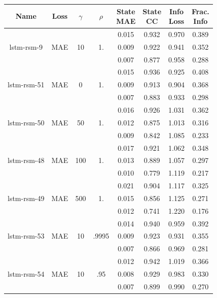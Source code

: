 \begin{table}[H]
\centering
    \begin{tabular}{c|c|c|c|c|c|c|c }
    \small
Name & Loss & $\gamma$ & $\rho$ & \thead{State\\MAE} & \thead{State\\CC} & \thead{Info\\Loss} &\thead{Frac.\\Info}\\
\hline
\multirow{3}{6em}{lstm-rsm-9} & \multirow{3}{3em}{MAE} & \multirow{3}{3em}{10} &  \multirow{3}{3em}{1.} & 0.015 & 0.932 & 0.970 & 0.389 \\ & & & & 0.009 & 0.922 & 0.941 & 0.352 \\ & & & & 0.007 & 0.877 & 0.958 & 0.288 \\
\hline
\hline
\multirow{3}{6em}{lstm-rsm-51} & \multirow{3}{3em}{MAE} & \multirow{3}{3em}{0} &  \multirow{3}{3em}{1.} & 0.015 & 0.936 & 0.925 & 0.408 \\ & & & & 0.009 & 0.913 & 0.904 & 0.368 \\ & & & & 0.007 & 0.883 & 0.933 & 0.298 \\
\hline
\multirow{3}{6em}{lstm-rsm-50} & \multirow{3}{3em}{MAE} & \multirow{3}{3em}{50} &  \multirow{3}{3em}{1.} & 0.016 & 0.926 & 1.031 & 0.362 \\ & & & & 0.012 & 0.875 & 1.013 & 0.316 \\ & & & & 0.009 & 0.842 & 1.085 & 0.233 \\
\hline
\multirow{3}{6em}{lstm-rsm-48} & \multirow{3}{3em}{MAE} & \multirow{3}{3em}{100} &  \multirow{3}{3em}{1.} & 0.017 & 0.921 & 1.062 & 0.348 \\ & & & & 0.013 & 0.889 & 1.057 & 0.297 \\ & & & & 0.010 & 0.779 & 1.119 & 0.217 \\
\hline
\multirow{3}{6em}{lstm-rsm-49} & \multirow{3}{3em}{MAE} & \multirow{3}{3em}{500} &  \multirow{3}{3em}{1.} & 0.021 & 0.904 & 1.117 & 0.325 \\ & & & & 0.015 & 0.856 & 1.125 & 0.271 \\ & & & & 0.012 & 0.741 & 1.220 & 0.176 \\
\hline
\hline
\multirow{3}{6em}{lstm-rsm-53} & \multirow{3}{3em}{MAE} & \multirow{3}{3em}{10} &  \multirow{3}{3em}{.9995} & 0.014 & 0.940 & 0.959 & 0.392 \\ & & & & 0.009 & 0.923 & 0.931 & 0.355 \\ & & & & 0.007 & 0.866 & 0.969 & 0.281 \\
\hline
\multirow{3}{6em}{lstm-rsm-54} & \multirow{3}{3em}{MAE} & \multirow{3}{3em}{10} &  \multirow{3}{3em}{.95} & 0.012 & 0.942 & 1.019 & 0.366 \\ & & & & 0.008 & 0.929 & 0.983 & 0.330 \\ & & & & 0.007 & 0.899 & 0.990 & 0.270 \\

\end{tabular}
\end{table}
